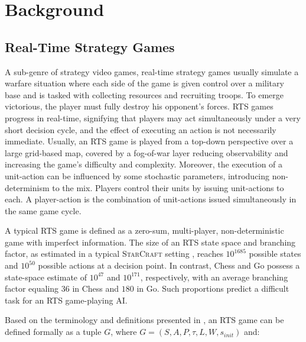 \documentclass[conference]{IEEEtran}
\begin{document}

\section{Background}
\label{sec:background}

\subsection{Real-Time Strategy Games}

A sub-genre of strategy video games, real-time strategy games usually simulate a warfare situation where each side of the game is given control over a military base and is tasked with collecting resources and recruiting troops.
 To emerge victorious, the player must fully destroy his opponent's forces. RTS games progress in real-time, signifying that players may act simultaneously under a very short decision cycle, and the effect of executing an action is not necessarily immediate. Usually, an RTS game is played from a top-down perspective over a large grid-based map, covered by a fog-of-war layer reducing observability and increasing the game's difficulty and complexity. Moreover, the execution of a unit-action can be influenced by some stochastic parameters,
 introducing non-determinism to the mix. Players control their units by issuing unit-actions to each. A player-action is the combination of unit-actions issued simultaneously in the same game cycle.
 

A typical RTS game is defined as a zero-sum, multi-player, non-deterministic game with imperfect information. The size of an RTS state space and branching factor, as estimated in a typical \textsc{StarCraft} setting \cite{ontanon_survey_2013}, reaches $10^{1685}$ possible states and $10^{50}$ possible actions at a decision point. In contrast, Chess and Go possess a state-space estimate of $10^{47}$ and $10^{171}$, respectively, with an average branching factor equaling $36$ in Chess and $180$ in Go. Such proportions predict a difficult task for an RTS game-playing AI.

Based on the terminology and definitions presented in \cite{ontanon_combinatorial_2017}, an RTS game can be defined formally as a tuple $G$, where $G = (S, A, P, \tau, L, W, s_{init})$ and:
\end{document}

